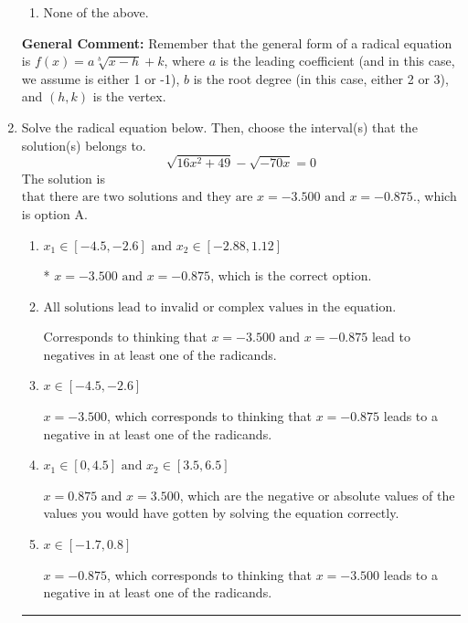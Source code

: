 \documentclass{extbook}[14pt]
\newcommand{\litem}[1]{\item #1

\rule{\textwidth}{0.4pt}}
\begin{document}
\begin{enumerate}
{\begin{enumerate}[label=\Alph*.]
\item None of the above.\end{enumerate}
\textbf{General Comment:} Remember that the general form of a radical equation is $ f(x) = a \sqrt[b]{x - h} + k $, where $a$ is the leading coefficient (and in this case, we assume is either 1 or -1), $b$ is the root degree (in this case, either 2 or 3), and $(h, k)$ is the vertex.
}
\litem{
Solve the radical equation below. Then, choose the interval(s) that the solution(s) belongs to.
\[ \sqrt{16 x^2 + 49} - \sqrt{-70 x} = 0 \]The solution is \( \text{that there are two solutions and they are } x = -3.500 \text{ and } x = -0.875. \), which is option A.\begin{enumerate}[label=\Alph*.]
\item \( x_1 \in [-4.5, -2.6] \text{ and } x_2 \in [-2.88,1.12] \)

* $x = -3.500 \text{ and } x = -0.875$, which is the correct option.
\item \( \text{All solutions lead to invalid or complex values in the equation.} \)

Corresponds to thinking that $x = -3.500 \text{ and } x = -0.875$ lead to negatives in at least one of the radicands.
\item \( x \in [-4.5,-2.6] \)

$x = -3.500$, which corresponds to thinking that $x = -0.875$ leads to a negative in at least one of the radicands.
\item \( x_1 \in [0, 4.5] \text{ and } x_2 \in [3.5,6.5] \)

$x = 0.875 \text{ and } x = 3.500$, which are the negative or absolute values of the values you would have gotten by solving the equation correctly.
\item \( x \in [-1.7,0.8] \)

$x = -0.875$, which corresponds to thinking that $x = -3.500$ leads to a negative in at least one of the radicands.
\end{enumerate}

}
\end{enumerate}
\end{document}
